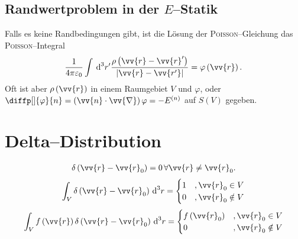 \documentclass[a4paper,12pt]{article}
\newcommand{\td}{\,\text{d}}
\numberwithin{equation}{section}
\begin{document}
\subsection{Randwertproblem in der $E$--Statik}
Falls es keine Randbedingungen gibt, ist die Lösung der \textsc{Poisson}--Gleichung das \textsc{Poisson}--Integral
\begin{align} 
        \dfrac{1}{4\pi \varepsilon _0}\int_{}^{}\td ^3r'\dfrac{\rho \left(\vv{r}-\vv{r}'\right)}{|\vv{r}-\vv{r'}|}=\varphi \left(\vv{r}\right)
.\end{align} 
Oft ist aber $\rho \left(\vv{r}\right)$ in einem Raumgebiet $V$ und $\varphi $, oder $\diffp[]{\varphi }{n}=\left(\vv{n}\cdot \vv{\nabla }\right)\varphi =-E^{\left(n\right)}$ auf $S\left(V\right)$ gegeben.

\newpage
\section{Delta--Distribution}
\begin{align} 
        \delta \left(\vv{r}-\vv{r}_0\right)=0\,\forall \vv{r}\neq \vv{r}_0
.\end{align} 
\begin{align} 
        \int_{V}^{}\delta \left(\vv{r}-\vv{r}_0\right)\td ^3r=\begin{cases}
                1&,\vv{r}_0 \in V\\
                0&,\vv{r}_0 \notin V
        \end{cases}
\end{align} 
\begin{align} 
        \int_{V}^{}f\left(\vv{r}\right)\delta \left(\vv{r}-\vv{r}_0\right)\td ^3r=\begin{cases}
                f\left(\vv{r}_0\right)&,\vv{r}_0 \in V\\
                0&,\vv{r}_0 \notin V
        \end{cases}
\end{align} 


\newpage
\end{document}
